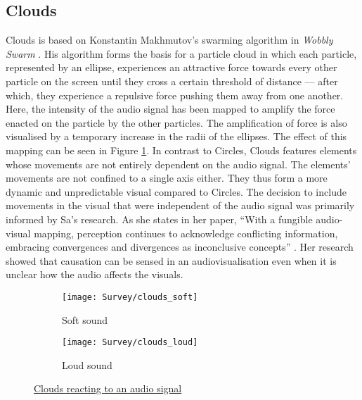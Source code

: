 \documentclass[../initial_thesis.tex]{subfiles}
\begin{document}
\subsection{Clouds}
Clouds is based on Konstantin Makhmutov's swarming algorithm in \textit{Wobbly Swarm} \cite{Makhmutov}. His algorithm forms the basis for a particle cloud in which each particle, represented by an ellipse, experiences an attractive force towards every other particle on the screen until they cross a certain threshold of distance --- after which, they experience a repulsive force pushing them away from one another. Here, the intensity of the audio signal has been mapped to amplify the force enacted on the particle by the other particles. The amplification of force is also visualised by a temporary increase in the radii of the ellipses. The effect of this mapping can be seen in Figure \ref{fig:clouds1}. In contrast to Circles, Clouds features elements whose movements are not entirely dependent on the audio signal. The elements' movements are not confined to a single axis either. They thus form a more dynamic and unpredictable visual compared to Circles. The decision to include movements in the visual that were independent of the audio signal was primarily informed by Sa's research. As she states in her paper, ``With a fungible audio-visual mapping, perception continues to acknowledge conflicting information, embracing convergences and divergences as inconclusive concepts'' \cite{Sa2014}. Her research showed that causation can be sensed in an audiovisualisation even when it is unclear how the audio affects the visuals. 

\begin{figure}
  \begin{subfigure}{0.5\textwidth}
    \texttt{[image: Survey/clouds\_soft]}
    \caption{Soft sound}
  \end{subfigure} 
  \begin{subfigure}{0.5\textwidth}
    \texttt{[image: Survey/clouds\_loud]}
    \caption{Loud sound}
  \end{subfigure}
  \caption{\href{https://vimeo.com/326766069}{Clouds reacting to an audio signal}}
  \label{fig:clouds1}
\end{figure}
\end{document}

